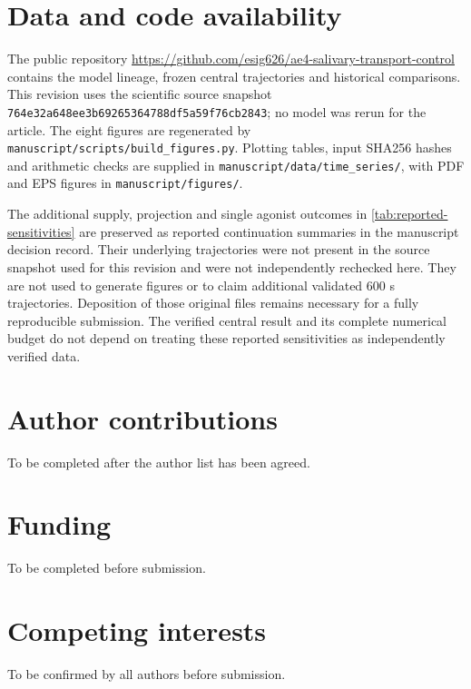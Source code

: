 \documentclass[11pt]{article}
\begin{document}




\section*{Data and code availability}
The public repository \url{https://github.com/esig626/ae4-salivary-transport-control} contains the model lineage, frozen central trajectories and historical comparisons. This revision uses the scientific source snapshot \nolinkurl{764e32a648ee3b69265364788df5a59f76cb2843}; no model was rerun for the article. The eight figures are regenerated by \nolinkurl{manuscript/scripts/build_figures.py}. Plotting tables, input SHA256 hashes and arithmetic checks are supplied in \nolinkurl{manuscript/data/time_series/}, with PDF and EPS figures in \nolinkurl{manuscript/figures/}.

The additional supply, projection and single agonist outcomes in \cref{tab:reported-sensitivities} are preserved as reported continuation summaries in the manuscript decision record. Their underlying trajectories were not present in the source snapshot used for this revision and were not independently rechecked here. They are not used to generate figures or to claim additional validated 600 s trajectories. Deposition of those original files remains necessary for a fully reproducible submission. The verified central result and its complete numerical budget do not depend on treating these reported sensitivities as independently verified data.

\section*{Author contributions}
To be completed after the author list has been agreed.

\section*{Funding}
To be completed before submission.

\section*{Competing interests}
To be confirmed by all authors before submission.



\end{document}
